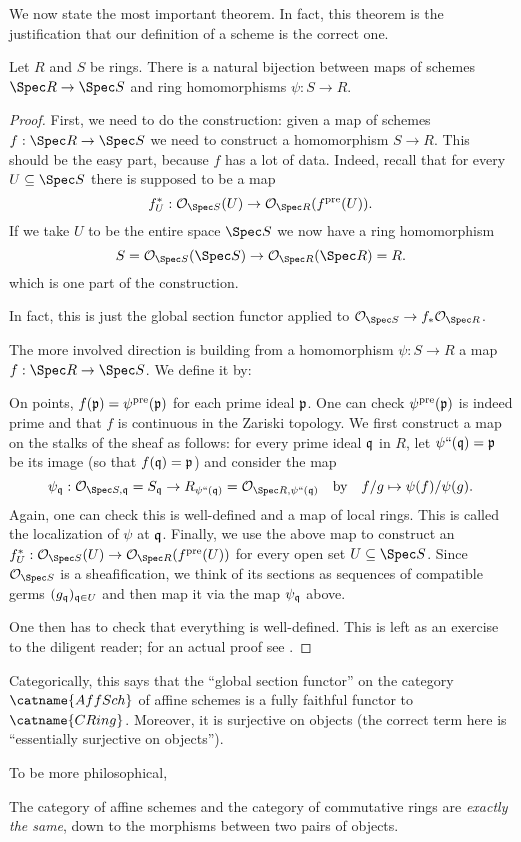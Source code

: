 \documentclass[11pt]{scrreprt}
\begin{document}
We now state the most important theorem.
In fact, this theorem is the justification that our definition
of a scheme is the correct one.
\begin{theorem}
	Let $R$ and $S$ be rings.
	There is a natural bijection between maps of schemes $\Spec R \to \Spec S$	
	and ring homomorphisms $\psi : S \to R$.
\end{theorem}
\begin{proof}
	First, we need to do the construction:
	given a map of schemes $f : \Spec R \to \Spec S$ 
	we need to construct a homomorphism $S \to R$.
	This should be the easy part, because $f$ has a lot of data.
	Indeed, recall that for every $U \subseteq \Spec S$
	there is supposed to be a map
	\[ f^\ast_U : \OO_{\Spec S} (U) \to \OO_{\Spec R}(f\pre(U)). \]
	If we take $U$ to be the entire space $\Spec S$ we now have a ring homomorphism
	\[ S = \OO_{\Spec S} (\Spec S) \to \OO_{\Spec R} (\Spec R) = R. \]
	which is one part of the construction.

	In fact, this is just the global section functor
	applied to $\OO_{\Spec S} \to f_\ast \OO_{\Spec R}$.

	The more involved direction is building from a homomorphism
	$\psi : S \to R$ a map $f : \Spec R \to \Spec S$.
	We define it by:
	\begin{itemize}
		\ii On points, $f(\mathfrak p) = \psi^{\text{pre}}(\mathfrak p)$ for each prime ideal $\mathfrak p$.
		One can check $\psi^{\text{pre}}(\mathfrak p)$ is indeed prime
		and that $f$ is continuous in the Zariski topology.
		\ii We first construct a map on the stalks of the sheaf as follows:
		for every prime ideal $\mathfrak q$ in $R$, let $\psi``(\mathfrak q) = \mathfrak p$ be its image
		(so that $f(\mathfrak q) = \mathfrak p$) and consider the map
		\[ \psi_\qq : \OO_{\Spec S, \qq} = S_{\qq}
			\to R_{\psi``(\qq)} = \OO_{\Spec R, \psi``(\qq)}
			\quad\text{by}\quad f/g \mapsto \psi(f)/\psi(g). \]
		Again, one can check this is well-defined and a map of local rings.
		This is called the localization of $\psi$ at $\mathfrak q$.
		\ii Finally, we use the above map to construct an
		$f^\ast_U : \OO_{\Spec S}(U) \to \OO_{\Spec R}(f\pre(U))$
		for every open set  $U \subseteq \Spec S$.
		Since $\OO_{\Spec S}$ is a sheafification, we think of its
		sections as sequences of compatible germs $(g_\mathfrak q)_{\mathfrak q \in U}$
		and then map it via the map $\psi_\mathfrak q$ above.
	\end{itemize}
	One then has to check that everything is well-defined.
	This is left as an exercise to the diligent reader;
	for an actual proof see \cite[Proposition 6.3.2]{ref:vakil}.
\end{proof}
\begin{remark}
	Categorically, this says that the ``global section functor''
	on the category $\catname{AffSch}$ of affine schemes is a
	fully faithful functor to $\catname{CRing}$.
	Moreover, it is surjective on objects
	(the correct term here is ``essentially surjective on objects'').
\end{remark}
To be more philosophical,
\begin{moral}
	The category of affine schemes and the
	category of commutative rings are \emph{exactly the same},
	down to the morphisms between two pairs of objects.
\end{moral}
\end{document}
